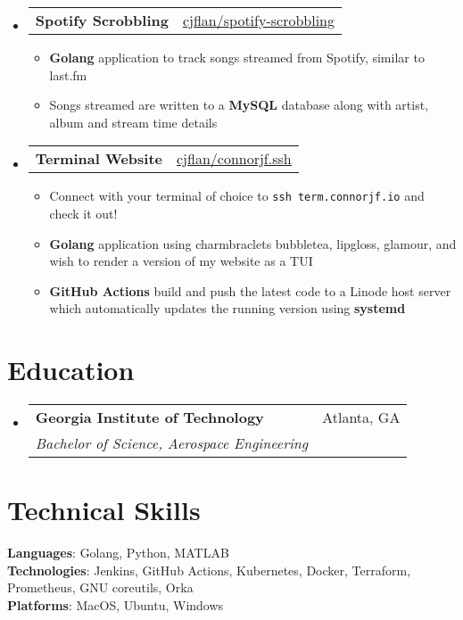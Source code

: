 \documentclass[letterpaper,11pt]{article}
\makeatletter
\newcommand{\resumeItem}[1]{
  \item\small{
      {#1 \vspace{-2pt}}
    }
    }
\newcommand{\resumeSubheading}[4]{
    \vspace{-2pt}\item
      \begin{tabular*}{0.97\textwidth}[t]{l@{\extracolsep{\fill}}r}
        \textbf{#1} & #2 \\
        \textit{\small#3} & \textit{\small #4} \\
      \end{tabular*}\vspace{-7pt}
      }
\newcommand{\resumeProjectHeading}[2]{
          \item
            \begin{tabular*}{0.97\textwidth}{l@{\extracolsep{\fill}}r}
              \small#1 & #2 \\
            \end{tabular*}\vspace{-7pt}
            }
\newcommand{\resumeSubHeadingListStart}{\begin{itemize}[leftmargin=0.15in, label={}]}
\newcommand{\resumeSubHeadingListEnd}{\end{itemize}}
\newcommand{\resumeItemListStart}{\begin{itemize}}
\newcommand{\resumeItemListEnd}{\end{itemize}\vspace{-5pt}}
\makeatother
\begin{document}
            \resumeSubHeadingListStart

            \resumeProjectHeading
            {\textbf{Spotify Scrobbling}}{\href{https://github.com/cjflan/spotify-scrobbling}{\underline{cjflan/spotify-scrobbling}}}
            \resumeItemListStart
            \resumeItem{\textbf{Golang} application to track songs streamed from Spotify, similar to last.fm}
            \resumeItem{Songs streamed are written to a \textbf{MySQL} database along with artist, album and stream time details}
            \resumeItemListEnd

            \resumeProjectHeading
            {\textbf{Terminal Website}}{\href{https://github.com/cjflan/connorjf.ssh/}{\underline{cjflan/connorjf.ssh}}}
            \resumeItemListStart
            \resumeItem{Connect with your terminal of choice to \texttt{ssh term.connorjf.io} and check it out!}
            \resumeItem{\textbf{Golang} application using charmbraclets bubbletea, lipgloss, glamour, and wish to render a version of my website as a TUI}
            \resumeItem{\textbf{GitHub Actions} build and push the latest code to a Linode host server which automatically updates the running version using \textbf{systemd}}
            \resumeItemListEnd

            \resumeSubHeadingListEnd

            \section{Education}
            \resumeSubHeadingListStart
            \resumeSubheading
            {Georgia Institute of Technology}{Atlanta, GA}
            {Bachelor of Science, Aerospace Engineering}{}

            \resumeSubHeadingListEnd

            \section{Technical Skills}
            \begin{itemize}[leftmargin=0.15in, label={}]
              \small{\item{
                  \textbf{Languages}{: Golang, Python, MATLAB} \\
                  \textbf{Technologies}{: Jenkins, GitHub Actions, Kubernetes, Docker, Terraform, Prometheus, GNU coreutils, Orka} \\
                  \textbf{Platforms}{: MacOS, Ubuntu, Windows} 
                }}
            \end{itemize}
\end{document}
